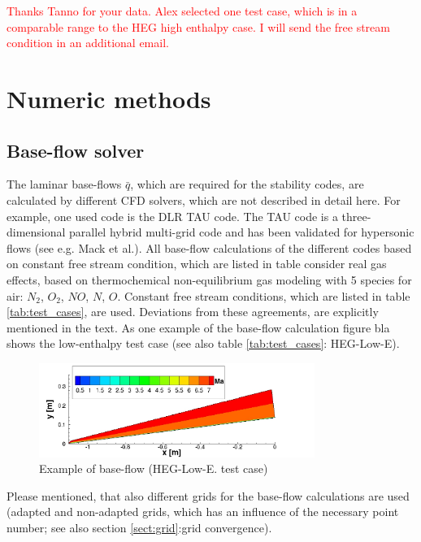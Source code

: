 \documentclass[]{aiaa-tc}%
\begin{document}
\textcolor{red}{Thanks Tanno for your data. Alex selected one test case, which is in a comparable range to the HEG high enthalpy case. I will send the free stream condition in an additional email.}






\section{Numeric methods}
\subsection{Base-flow solver}
The laminar base-flows $\bar{q}$, which are required for the stability codes, are calculated by different CFD solvers, which are not described in detail here. For example, one used code is the DLR TAU code. The TAU code is a three-dimensional parallel hybrid multi-grid code and has been validated for hypersonic flows (see e.g. Mack et al.\cite{Mack_2002}). All base-flow calculations of the different codes based on constant free stream condition, which are listed in table consider real gas effects, based on thermochemical non-equilibrium gas modeling with 5 species for air: $N_2$, $O_2$, $NO$, $N$, $O$. Constant free stream conditions, which are listed in table \ref{tab:test_cases}, are used. Deviations from these agreements,  are explicitly mentioned in the text. As one example of the base-flow calculation figure bla shows the low-enthalpy test case (see also table \ref{tab:test_cases}: HEG-Low-E). 

\begin{figure}[htbp]
	\centering
\includegraphics[width=0.8\textwidth]{pics/heg_low_e_base_flow.jpg}
	\caption{Example of base-flow (HEG-Low-E. test case)}
	\label{fig:cone_model}
\end{figure}

Please mentioned, that also different grids for the base-flow calculations are used (adapted and non-adapted grids, which has an influence of the necessary point number; see also section \ref{sect:grid}:grid convergence).
\end{document}
